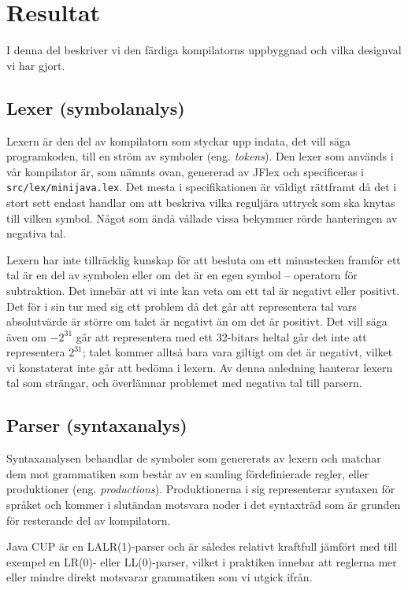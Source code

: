 \documentclass[a4paper,11pt]{article}
\newcommand{\trans}[2][eng.]{(#1 \emph{#2})}
\renewcommand{\*}[0]{\cdot}
\begin{document}
\section*{Resultat}

I denna del beskriver vi den färdiga kompilatorns uppbyggnad och vilka
designval vi har gjort.

\subsection*{Lexer (symbolanalys)}

Lexern är den del av kompilatorn som styckar upp indata, det vill säga
programkoden, till en ström av symboler \trans{tokens}. Den lexer som används i
vår kompilator är, som nämnts ovan, genererad av JFlex och specificeras i
\texttt{src/lex/minijava.lex}. Det mesta i specifikationen är väldigt rättframt
då det i stort sett endast handlar om att beskriva vilka reguljära uttryck som
ska knytas till vilken symbol. Något som ändå vållade vissa bekymmer rörde
hanteringen av negativa tal.

Lexern har inte tillräcklig kunskap för att besluta om ett minustecken framför
ett tal är en del av symbolen eller om det är en egen symbol -- operatorn för
subtraktion. Det innebär att vi inte kan veta om ett tal är negativt eller
positivt. Det för i sin tur med sig ett problem då det går att representera tal
vars absolutvärde är större om talet är negativt än om det är positivt. Det
vill säga även om $-2^{31}$ går att representera med ett 32-bitars heltal går
det inte att representera $2^{31}$; talet kommer alltså bara vara giltigt om
det är negativt, vilket vi konstaterat inte går att bedöma i lexern. Av denna
anledning hanterar lexern tal som strängar, och överlämnar problemet med
negativa tal till parsern.

\subsection*{Parser (syntaxanalys)}

Syntaxanalysen behandlar de symboler som genererats av lexern och matchar dem
mot grammatiken som består av en samling fördefinierade regler, eller
produktioner \trans{productions}. Produktionerna i sig representerar syntaxen
för språket och kommer i slutändan motsvara noder i det syntaxträd som är
grunden för resterande del av kompilatorn.

Java CUP är en LALR(1)-parser och är således relativt kraftfull jämfört med
till exempel en LR(0)- eller LL(0)-parser, vilket i praktiken innebar att
reglerna mer eller mindre direkt motsvarar grammatiken som vi utgick ifrån.
\end{document}
